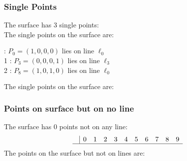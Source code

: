 \documentclass{article}
\begin{document}
{\subsubsection*{Single Points}
The surface has 3 single points:\\
The single points on the surface are:\\
\begin{multicols}{2}
 : $P_{0}=( 1, 0, 0, 0 )$ lies on line $\ell_{0}$\\
1 : $P_{3}=( 0, 0, 0, 1 )$ lies on line $\ell_{3}$\\
2 : $P_{8}=( 1, 0, 1, 0 )$ lies on line $\ell_{0}$\\
\end{multicols}
The single points on the surface are:\\
\subsubsection*{Points on surface but on no line}
The surface has 0 points not on any line:\\
$$
\begin{array}{r|*{10}{r}}
 & 0 & 1 & 2 & 3 & 4 & 5 & 6 & 7 & 8 & 9\\
\hline
\end{array}
$$
The points on the surface but not on lines are:\\
\begin{multicols}{2}
\noindent
\end{multicols}
}
\end{document}
